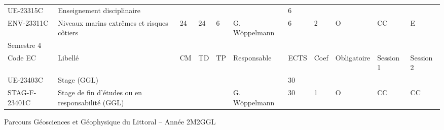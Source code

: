 \documentclass[a4paper,11pt]{article}
\begin{document}
{{\begin{tabular}{lllllllllll}
\rowcolor[HTML]{EFEFEF} 
UE-23315C                          & \cellcolor[HTML]{FD6864}Enseignement disciplinaire                                                     &    &    &                           &                                    & 6    &                           &             &                            &                            \\
ENV-23311C                         & Niveaux marins extrêmes et risques côtiers                                                             & 24 & 24 & 6                         & G. Wöppelmann                      & 6    & \cellcolor[HTML]{FD6864}2 & O           & CC                         & E                          \\
\rowcolor[HTML]{9B9B9B} 
Semestre 4                         &                                                                                                        &    &    &                           &                                    &      &                           &             &                            &                            \\
\rowcolor[HTML]{C0C0C0} 
Code EC                            & Libellé                                                                                                & CM & TD & TP                        & Responsable                        & ECTS & Coef                      & Obligatoire & Session 1                  & Session 2                  \\
\rowcolor[HTML]{EFEFEF} 
UE-23403C                          & Stage (GGL)                                                                                            &    &    &                           &                                    & 30   &                           &             &                            &                            \\
STAG-F-23401C                      & Stage de fin d'études ou en responsabilité (GGL)                                                       &    &    &                           & G. Wöppelmann                      & 30   & 1                         & O           & \cellcolor[HTML]{FD6864}CC & \cellcolor[HTML]{FD6864}CC
\end{tabular}}
}{Parcours Géosciences et Géophysique du Littoral -- Année 2}{M2GGL}
\end{document}
